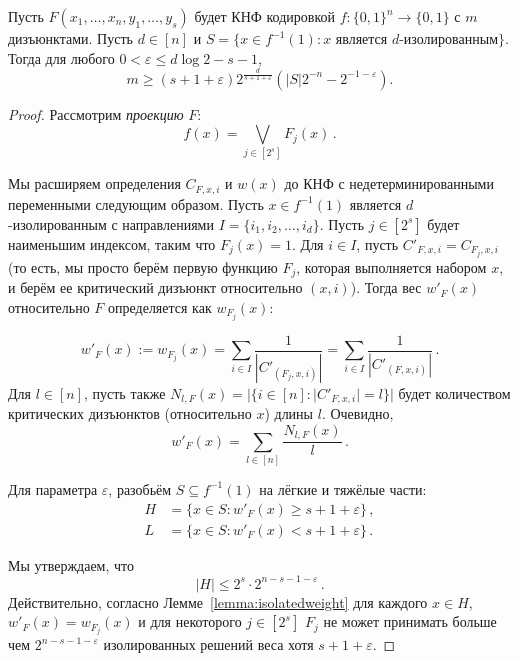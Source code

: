 \begin{lemma}\label{lemma:nofclauses}
	Пусть $F(x_1, \dotsc, x_n, y_1, \dotsc, y_s)$ будет КНФ кодировкой $f \colon \{0,1\}^n \to \{0,1\}$ с 
	$m$ дизъюнктами.
	Пусть $d \in [n]$ и $S = \{x \in f^{-1}(1) \colon \text{$x$ является $d$-изолированным}\}$.
	Тогда для любого $0 < \varepsilon \le d\log 2 - s - 1$,
	\[ m \ge (s+1+\varepsilon) 2^{\frac{d}{s+1+\varepsilon}} (|S|2^{-n} - 2^{-1-\varepsilon}). \]
\end{lemma}
\begin{proof}
	Рассмотрим \emph{проекцию} $F$:
	\[f(x)=\bigvee_{j \in [2^s]} F_j(x) \, .\]
	
	Мы расширяем определения $C_{F,x,i}$ и $w(x)$ до КНФ с недетерминированными переменными следующим образом. Пусть $x \in f^{-1}(1)$ является $d$-изолированным с направлениями $I = \{i_1, i_2, \dots, i_d\}$.
	Пусть $j \in [2^s]$ будет наименьшим индексом, таким что $F_j(x)=1$.
	Для $i \in I$, пусть $C'_{F,x,i}=C_{F_j,x,i}$ (то есть, мы просто берём
	первую функцию $F_j$, которая выполняется набором $x$, и берём ее критический дизъюнкт относительно $(x,i)$).
	Тогда вес $w'_F(x)$ относительно $F$ определяется как $w_{F_j}(x)$:
	
	\[w'_F(x) := w_{F_j}(x) = \sum_{i \in I} \frac{1}{|C'_{(F_j,x,i)}|}= \sum_{i \in I} \frac{1}{|C'_{(F,x,i)}|} \,. \]
	Для $l \in [n]$, пусть также $N_{l,F}(x)=|\{i \in [n] \colon |C'_{F,x,i}|=l\}|$
	будет количеством критических дизъюнктов (относительно $x$) длины $l$. Очевидно,
	\begin{equation}\label{eq:weight}
		w'_F(x)=\sum_{l \in [n]}\frac{N_{l,F}(x)}{l} \, .
	\end{equation}
	
	
	Для параметра $\varepsilon$, разобьём $S \subseteq f^{-1}(1)$
	на лёгкие и тяжёлые части:
	\begin{align}
		H &= \{x \in S  \colon w'_F(x) \ge s + 1 + \varepsilon\} \, ,\\
		L &= \{x \in S  \colon w'_F(x) < s + 1 + \varepsilon\} \, .
	\end{align}
	
	Мы утверждаем, что
	\begin{equation}\label{eq:H}
		|H| \le 2^s \cdot 2^{n-s-1-\varepsilon}\,.
	\end{equation}
	Действительно, согласно Лемме~\ref{lemma:isolatedweight} для каждого $x \in H$, $w'_F(x)=w_{F_j}(x)$ и для некоторого $j \in [2^s]$ $F_j$ не может принимать больше чем
	$2^{n-s-1-\varepsilon}$ изолированных решений веса хотя 
	$s+1+\varepsilon$. 
	

\end{proof}
